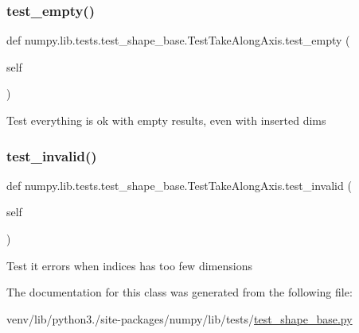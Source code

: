 \subsubsection{\texorpdfstring{test\+\_\+empty()}{test\_empty()}}
{\footnotesize\ttfamily def numpy.\+lib.\+tests.\+test\+\_\+shape\+\_\+base.\+Test\+Take\+Along\+Axis.\+test\+\_\+empty (\begin{DoxyParamCaption}\item[{}]{self }\end{DoxyParamCaption})}

\begin{DoxyVerb}Test everything is ok with empty results, even with inserted dims \end{DoxyVerb}
 \mbox{\label{classnumpy_1_1lib_1_1tests_1_1test__shape__base_1_1TestTakeAlongAxis_abb83e36e0aee652b45e0379e86874bfb}} 
\subsubsection{\texorpdfstring{test\+\_\+invalid()}{test\_invalid()}}
{\footnotesize\ttfamily def numpy.\+lib.\+tests.\+test\+\_\+shape\+\_\+base.\+Test\+Take\+Along\+Axis.\+test\+\_\+invalid (\begin{DoxyParamCaption}\item[{}]{self }\end{DoxyParamCaption})}

\begin{DoxyVerb}Test it errors when indices has too few dimensions \end{DoxyVerb}
 

The documentation for this class was generated from the following file\+:\begin{DoxyCompactItemize}
\item 
venv/lib/python3./site-\/packages/numpy/lib/tests/\hyperlink{lib_2tests_2test__shape__base_8py}{test\+\_\+shape\+\_\+base.\+py}\end{DoxyCompactItemize}
